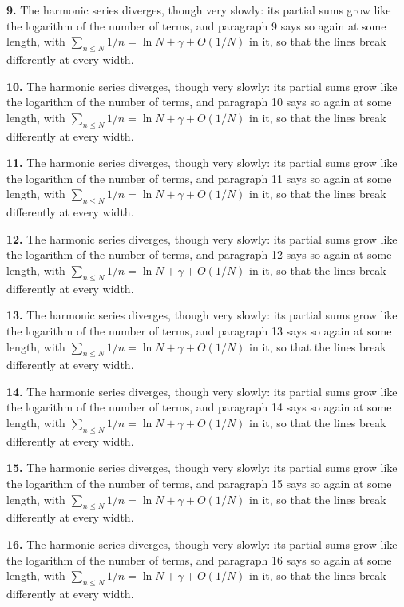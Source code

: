 \noindent\textbf{9.} The harmonic series diverges, though very slowly: its partial sums
grow like the logarithm of the number of terms, and paragraph 9 says so again
at some length, with $\sum_{n \le N} 1/n = \ln N + \gamma + O(1/N)$ in it,
so that the lines break differently at every width.

\noindent\textbf{10.} The harmonic series diverges, though very slowly: its partial sums
grow like the logarithm of the number of terms, and paragraph 10 says so again
at some length, with $\sum_{n \le N} 1/n = \ln N + \gamma + O(1/N)$ in it,
so that the lines break differently at every width.

\noindent\textbf{11.} The harmonic series diverges, though very slowly: its partial sums
grow like the logarithm of the number of terms, and paragraph 11 says so again
at some length, with $\sum_{n \le N} 1/n = \ln N + \gamma + O(1/N)$ in it,
so that the lines break differently at every width.

\noindent\textbf{12.} The harmonic series diverges, though very slowly: its partial sums
grow like the logarithm of the number of terms, and paragraph 12 says so again
at some length, with $\sum_{n \le N} 1/n = \ln N + \gamma + O(1/N)$ in it,
so that the lines break differently at every width.

\noindent\textbf{13.} The harmonic series diverges, though very slowly: its partial sums
grow like the logarithm of the number of terms, and paragraph 13 says so again
at some length, with $\sum_{n \le N} 1/n = \ln N + \gamma + O(1/N)$ in it,
so that the lines break differently at every width.

\noindent\textbf{14.} The harmonic series diverges, though very slowly: its partial sums
grow like the logarithm of the number of terms, and paragraph 14 says so again
at some length, with $\sum_{n \le N} 1/n = \ln N + \gamma + O(1/N)$ in it,
so that the lines break differently at every width.

\noindent\textbf{15.} The harmonic series diverges, though very slowly: its partial sums
grow like the logarithm of the number of terms, and paragraph 15 says so again
at some length, with $\sum_{n \le N} 1/n = \ln N + \gamma + O(1/N)$ in it,
so that the lines break differently at every width.

\noindent\textbf{16.} The harmonic series diverges, though very slowly: its partial sums
grow like the logarithm of the number of terms, and paragraph 16 says so again
at some length, with $\sum_{n \le N} 1/n = \ln N + \gamma + O(1/N)$ in it,
so that the lines break differently at every width.

